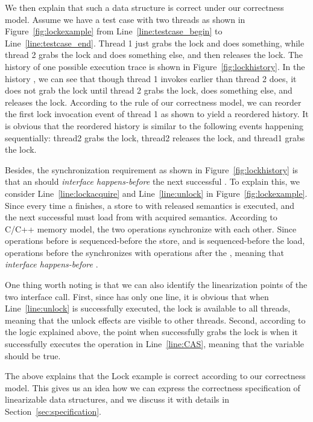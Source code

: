 We then explain that such a data structure is correct under our correctness
model. Assume we have a test case with two threads as shown in
Figure~\ref{fig:lockexample} from Line~\ref{line:testcase_begin} to
Line~\ref{line:testcase_end}. Thread 1 just grabs the lock and does something,
while thread 2 grabs the lock and does something else, and then releases the lock.
The history of one possible execution trace is shown in
Figure~\ref{fig:lockhistory}. In the history , we can see that though thread
1 invokes  earlier than thread 2 does, it does not grab the
lock until thread 2 grabs the lock, does something else, and releases the lock.
According to the rule of our correctness model, we can reorder the first lock
invocation event of thread 1 as shown to yield a reordered history. It is
obvious that the reordered history is similar to the following events
happening sequentially: thread2 grabs the lock, thread2 releases the lock, and
thread1 grabs the lock.

Besides, the synchronization requirement as shown in
Figure~\ref{fig:lockhistory} is that an  should {\it interface
happens-before} the next successful . To explain this, we consider
Line~\ref{line:lockacquire} and Line~\ref{line:unlock} in
Figure~\ref{fig:lockexample}. Since every time a  finishes, a
store to  with released semantics is executed, and the next successful 
must load from  with acquired semantics. According to C/C++ memory
model, the two operations synchronize with each other. Since operations before
 is sequenced-before the store, and  is
sequenced-before the load, operations before the  synchronizes
with operations after the , meaning that  {\it
interface happens-before} .

One thing worth noting is that we can also identify the linearization points of
the two interface call. First, since  has only one line, it is
obvious that when Line~\ref{line:unlock} is successfully executed, the lock is
available to all threads, meaning that the unlock effects are visible to other
threads. Second, according to the logic explained above, the point when
 successfully grabs the lock is when it successfully executes the
 operation in Line~\ref{line:CAS}, meaning that
the variable  should be true.

The above explains that the Lock example is correct according to our correctness
model. This gives us an idea how we can express the correctness specification of
linearizable data structures, and we discuss it with details in
Section~\ref{sec:specification}.

